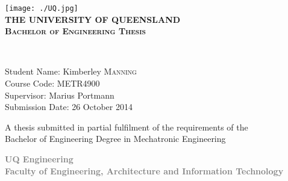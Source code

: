 \begin{titlepage}

\begin{center}

\texttt{[image: ./UQ.jpg]}\\[1.5cm]    

\textsc{\Large \bfseries {\Huge T}HE {\Huge U}NIVERSITY OF {\Huge Q}UEENSLAND}\\[2cm]

\textsc{\large \bfseries Bachelor of Engineering Thesis}\\[1.5cm]


\newlength{\mylength}

\setlength{\fboxsep}{1pt}
\setlength{\mylength}{\linewidth}

\addtolength{\mylength}{-1.5\fboxsep}
\addtolength{\mylength}{-1.5\fboxrule}


		
\textsc{}\\[1.5cm]

\begin{minipage}{0.8\textwidth}
\begin{flushleft} \large
Student Name: Kimberley \textsc{Manning}\\[0.1cm]
Course Code: METR4900\\[0.1cm]
Supervisor: Marius Portmann\\[0.1cm]
Submission Date: 26 October 2014\\[0.1cm]
\end{flushleft}
\end{minipage}




\vfill


{\small A thesis submitted in partial fulfilment of the requirements of the\\
Bachelor of Engineering Degree in Mechatronic Engineering\\[1.5cm]}

\textcolor{Gray}
{
{\small  \bfseries UQ Engineering\\[0.5cm]
Faculty of Engineering, Architecture and Information Technology}
}


\end{center}

\end{titlepage}
